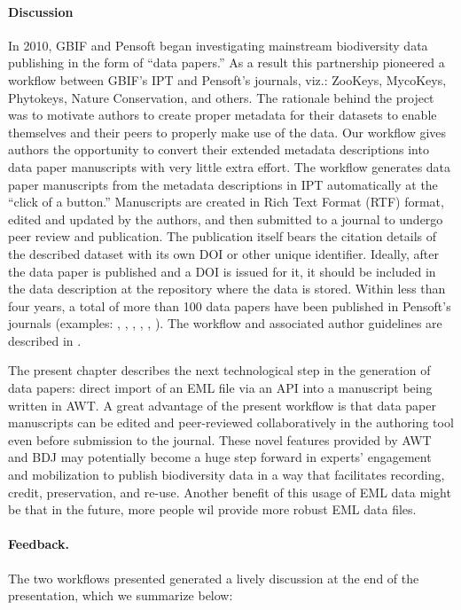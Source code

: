\paragraph{Discussion} In 2010, GBIF and Pensoft began investigating mainstream biodiversity data publishing in the form of ``data papers.'' As a result this partnership pioneered a workflow between GBIF’s IPT and Pensoft’s journals, viz.: ZooKeys, MycoKeys, Phytokeys, Nature Conservation, and others. The rationale behind the project was to motivate authors to create proper metadata for their datasets to enable themselves and their peers to properly make use of the data. Our workflow gives authors the opportunity to convert their extended metadata descriptions into data paper manuscripts with very little extra effort. The workflow generates data paper manuscripts from the metadata descriptions in IPT automatically at the ``click of a button.'' Manuscripts are created in Rich Text Format (RTF) format, edited and updated by the authors, and then submitted to a journal to undergo peer review and publication. The publication itself bears the citation details of the described dataset with its own DOI or other unique identifier. Ideally, after the data paper is published and a DOI is issued for it, it should be included in the data description at the repository where the data is stored. Within less than four years, a total of more than 100 data papers have been published in Pensoft's journals (examples: \cite{brosens_formidabel:_2013}, \cite{desmet_database_2013}, \cite{gutt_antarctic_2013}, \cite{pierrat_antarctic_2012}, \cite{shao_dataset_2012}, \cite{tng_vegetation_2016}). The workflow and associated author guidelines are described in \cite{penev_pensoft_2016}.

The present chapter describes the next technological step in the generation of data papers: direct import of an EML file via an API into a manuscript being written in AWT. A great advantage of the present workflow is that data paper manuscripts can be edited and peer-reviewed collaboratively in the authoring tool even before submission to the journal. These novel features provided by AWT and BDJ may potentially become a huge step forward in experts' engagement and mobilization to publish biodiversity data in a way that facilitates recording, credit, preservation, and re-use. Another benefit of this usage of EML data might be that in the future, more people wil provide more robust EML data files.

\paragraph{Feedback.} The two workflows presented generated a lively discussion at the end of the presentation, which we summarize below:


